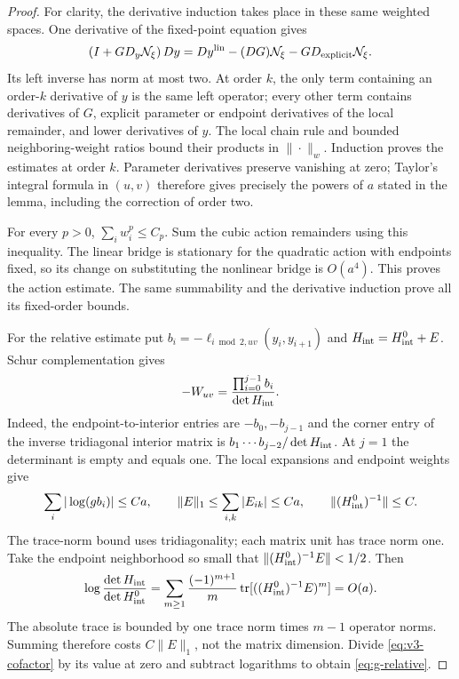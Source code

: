 \begin{proof}
For clarity, the derivative induction takes place in these same
weighted spaces. One derivative of the fixed-point equation gives
\[
 (I+G D_y\mathcal N_\xi)\,D y
     =D y^{\rm lin}-(D G)\mathcal N_\xi
                         -G D_{\rm explicit}\mathcal N_\xi.
\]
Its left inverse has norm at most two. At order $k$, the only term
containing an order-$k$ derivative of $y$ is the same left operator;
every other term contains derivatives of $G$, explicit parameter
or endpoint derivatives of the local remainder, and lower derivatives
of $y$. The local chain rule and bounded neighboring-weight ratios
bound their products in $\|\cdot\|_w$. Induction proves the estimates
at order $k$. Parameter derivatives preserve vanishing at zero;
Taylor's integral formula in $(u,v)$ therefore gives precisely the
powers of $a$ stated in the lemma, including the correction of order two.

For every $p>0$, $\sum_i w_i^p\le C_p$. Sum the cubic action
remainders using this inequality. The linear bridge is stationary for
the quadratic action with endpoints fixed, so its change on substituting
the nonlinear bridge is $O(a^4)$. This proves the action estimate.
The same summability and the derivative induction prove all its
fixed-order bounds.

For the relative estimate put
$b_i=-\ell_{i\bmod2,uv}(y_i,y_{i+1})$ and
$H_{\rm int}=H^0_{\rm int}+E$. Schur complementation gives
\begin{equation}\label{eq:v3-cofactor}
              -W_{uv}=\frac{\prod_{i=0}^{j-1}b_i}{\det H_{\rm int}}.
\end{equation}
Indeed, the endpoint-to-interior entries are $-b_0,-b_{j-1}$ and
the corner entry of the inverse tridiagonal interior matrix is
$b_1\cdots b_{j-2}/\det H_{\rm int}$. At $j=1$ the determinant
is empty and equals one. The local expansions and endpoint weights give
\[
 \sum_i|\log(gb_i)|\le Ca,\qquad
 \|E\|_1\le\sum_{i,k}|E_{ik}|\le Ca,\qquad
 \|(H^0_{\rm int})^{-1}\|\le C.
\]
The trace-norm bound uses tridiagonality; each matrix unit has trace
norm one. Take the endpoint neighborhood so small that
$\|(H^0_{\rm int})^{-1}E\|<1/2$. Then
\begin{equation}\label{eq:v3-logdet}
 \log\frac{\det H_{\rm int}}{\det H^0_{\rm int}}
 =\sum_{m\ge1}\frac{(-1)^{m+1}}m
       \operatorname{tr}[((H^0_{\rm int})^{-1}E)^m]=O(a).
\end{equation}
The absolute trace is bounded by one trace norm times $m-1$ operator
norms. Summing therefore costs $C\|E\|_1$, not the matrix dimension.
Divide \eqref{eq:v3-cofactor} by its value at zero and subtract
logarithms to obtain \eqref{eq:g-relative}.


\end{proof}
